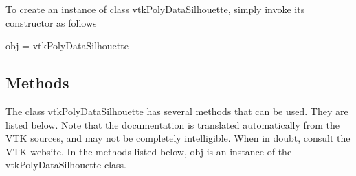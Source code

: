 To create an instance of class vtk\-Poly\-Data\-Silhouette, simply invoke its constructor as follows \begin{DoxyVerb}  obj = vtkPolyDataSilhouette
\end{DoxyVerb}
 \hypertarget{vtkwidgets_vtkxyplotwidget_Methods}{}\subsection{Methods}\label{vtkwidgets_vtkxyplotwidget_Methods}
The class vtk\-Poly\-Data\-Silhouette has several methods that can be used. They are listed below. Note that the documentation is translated automatically from the V\-T\-K sources, and may not be completely intelligible. When in doubt, consult the V\-T\-K website. In the methods listed below, {\ttfamily obj} is an instance of the vtk\-Poly\-Data\-Silhouette class. 
